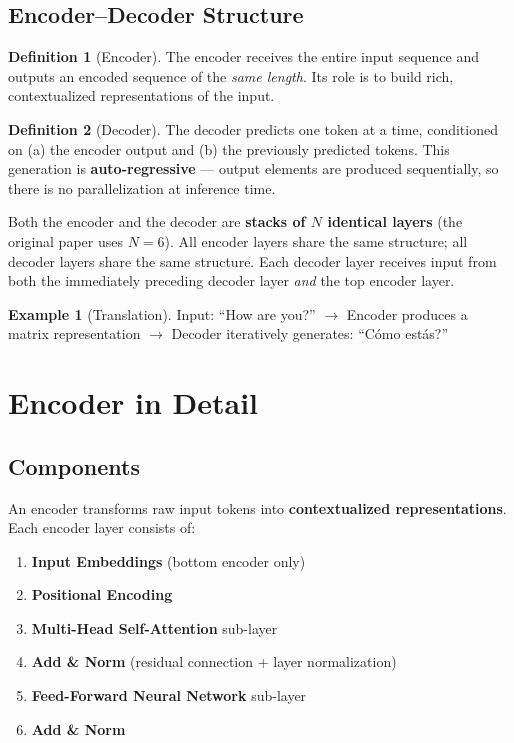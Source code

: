 \documentclass[11pt,a4paper]{article}
\theoremstyle{definition}
\newtheorem{definition}{Definition}[section]
\newtheorem{example}{Example}[section]
\theoremstyle{plain}
\theoremstyle{remark}
\begin{document}
\subsection{Encoder--Decoder Structure}

\begin{definition}[Encoder]
The encoder receives the entire input sequence and outputs an encoded sequence of the \emph{same length}. Its role is to build rich, contextualized representations of the input.
\end{definition}

\begin{definition}[Decoder]
The decoder predicts one token at a time, conditioned on (a) the encoder output and (b) the previously predicted tokens. This generation is \textbf{auto-regressive} --- output elements are produced sequentially, so there is no parallelization at inference time.
\end{definition}

Both the encoder and the decoder are \textbf{stacks of $N$ identical layers} (the original paper uses $N=6$). All encoder layers share the same structure; all decoder layers share the same structure. Each decoder layer receives input from both the immediately preceding decoder layer \emph{and} the top encoder layer.

\begin{example}[Translation]
Input: ``How are you?'' $\to$ Encoder produces a matrix representation $\to$ Decoder iteratively generates: ``\textquestiondown C\'omo est\'as?''
\end{example}


\section{Encoder in Detail}

\subsection{Components}

An encoder transforms raw input tokens into \textbf{contextualized representations}. Each encoder layer consists of:

\begin{enumerate}
    \item \textbf{Input Embeddings} (bottom encoder only)
    \item \textbf{Positional Encoding}
    \item \textbf{Multi-Head Self-Attention} sub-layer
    \item \textbf{Add \& Norm} (residual connection + layer normalization)
    \item \textbf{Feed-Forward Neural Network} sub-layer
    \item \textbf{Add \& Norm}
\end{enumerate}
\end{document}
